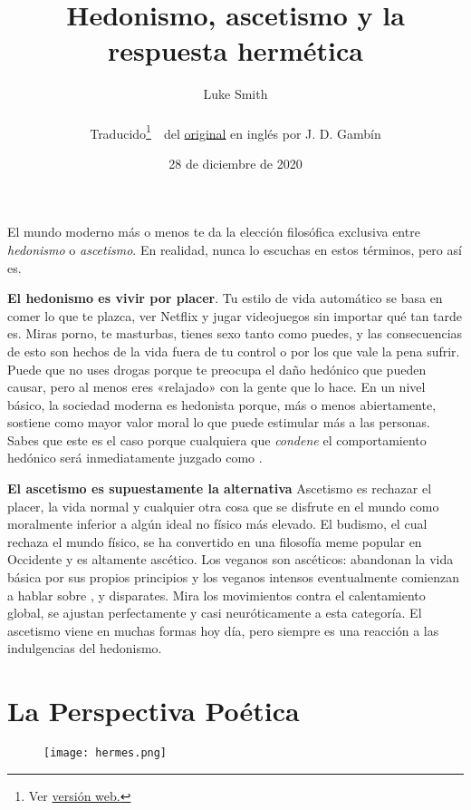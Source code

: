 \documentclass{article}
\title{Hedonismo, ascetismo y la respuesta hermética}
\author
{
	Luke Smith\\\\
	\small
	{
		Traducido\footnote{Ver \href{https://jdgambin.github.io/tr/harh.html}
		{versión web.}}\ \ del \href{https://lukesmith.xyz/articles/poetic}
		{original} en inglés por J. D. Gambín
	}
}
\date{\small{28 de diciembre de 2020}}
\begin{document}
	\maketitle

	El mundo moderno más o menos te da la elección filosófica
	exclusiva entre \textit{hedonismo} o \textit{ascetismo}.
	En realidad, nunca lo escuchas en estos términos, pero así es.

	\textbf{El hedonismo es vivir por placer}. Tu estilo de vida automático
	se basa en comer lo que te plazca, ver Netflix y jugar videojuegos sin
	importar qué tan tarde es. Miras porno, te masturbas, tienes sexo tanto
	como puedes, y las consecuencias de esto son hechos de la vida fuera de
	tu control o por los que vale la pena sufrir. Puede que no uses drogas
	porque te preocupa el daño hedónico que pueden causar, pero al menos
	eres «relajado» con la gente que lo hace. En un nivel básico, la
	sociedad moderna es hedonista porque, más o menos abiertamente, sostiene
	como mayor valor moral lo que puede estimular más a las personas. Sabes
	que este es el caso porque cualquiera que \textit{condene} el
	comportamiento hedónico será inmediatamente juzgado como
	.

	\textbf{El ascetismo es supuestamente la alternativa
	} Ascetismo es rechazar el placer, la vida normal
	y cualquier otra cosa que se disfrute en el mundo como moralmente
	inferior a algún ideal no físico más elevado. El budismo, el cual
	rechaza el mundo físico, se ha convertido en una filosofía meme popular
	en Occidente y es altamente ascético. Los veganos son ascéticos:
	abandonan la vida básica por sus propios principios y los veganos
	intensos eventualmente comienzan a hablar sobre ,
	 y disparates. Mira los movimientos contra el
	calentamiento global, se ajustan perfectamente y casi neuróticamente a
	esta categoría. El ascetismo viene en muchas formas hoy día, pero
	siempre es una reacción a las indulgencias del hedonismo.

	\newpage

	\section*{La Perspectiva Poética}

	\begin{figure}[ht]
	\centering
	\texttt{[image: hermes.png]}
	\end{figure}	
\end{document}

